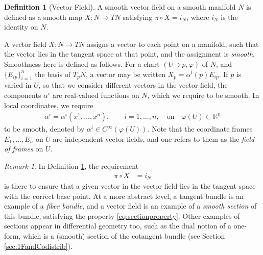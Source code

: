 \documentclass[psamsfonts]{amsart}
\theoremstyle{definition}
\newtheorem{defn}[thm]{Definition}
\theoremstyle{remark}
\newtheorem{rem}[thm]{Remark}
\newcommand*\R{\mathds{R}}
\numberwithin{equation}{section}
\begin{document}

\begin{defn}[Vector Field]\label{def:vectorfield}
A smooth vector field on a smooth manifold $N$ is defined as a smooth map $X:N\rightarrow TN$ satisfying $\pi \circ X = i_N$, where $i_N$ is the identity on $N$. 
\end{defn}
A vector field $X: N \rightarrow TN$ assigns a vector to each point on a manifold, such that the vector lies in the tangent space at that point, and the assignment is \textit{smooth}. Smoothness here is defined as follows. For a chart $(U\ni p, \varphi)$ of $N$, and $\{E_{ip}\}_{i = 1}^n$ the basis of $T_pN$, a vector may be written $X_p = \alpha^i(p) E_{ip}$. If $p$ is varied in $U$, so that we consider different vectors in the vector field, the components $\alpha^i$ are real-valued functions on $N$, which we require to be smooth. In local coordinates, we require 
\begin{equation}\label{eq:vectorfieldcoeff}
\begin{aligned}
\alpha^i = \alpha^i(x^1, \dots, x^n), \qquad i = 1, \dots, n, \quad \text{on}\quad \varphi(U)\subset \R^n
\end{aligned}
\end{equation} 
to be smooth, denoted by $\alpha^i \in C^{\infty}(\varphi(U))$. Note that the coordinate frames $E_1, \dots, E_n$ on $U$ are independent vector fields, and one refers to them as the \textit{field of frames} on $U$. 
\begin{rem}
In Definition \ref{def:vectorfield}, the requirement 
\begin{align}\label{eq:sectionproperty}
\pi \circ X &= i_N
\end{align}
 is there to ensure that a given vector in the vector field lies in the tangent space with the correct base point. At a more abstract level, a tangent bundle is an example of a \textit{fiber bundle}, and a vector field is an example of a \textit{smooth section} of this bundle, satisfying the property \ref{eq:sectionproperty}. Other examples of sections appear in differential geometry too, such as the dual notion of a one-form, which is a (smooth) section of the cotangent bundle (see Section \ref{sec:1FandCodistrib}). 
\end{rem}
\end{document}
